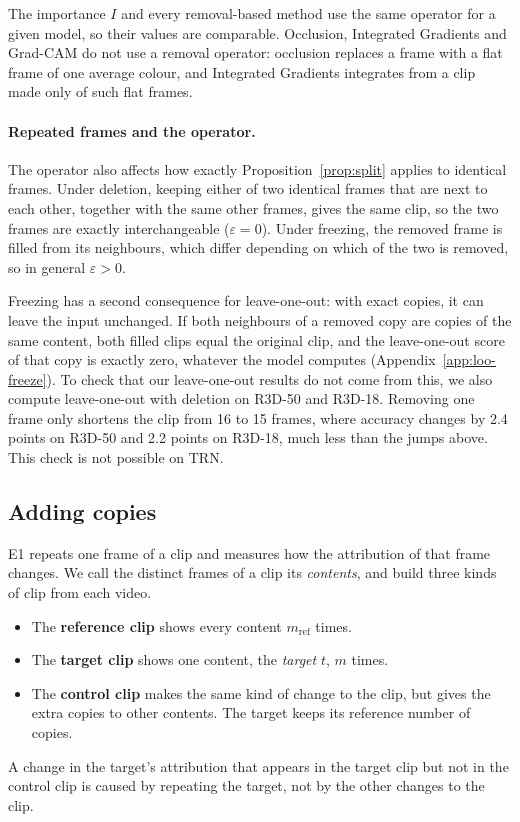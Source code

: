 The importance $I$ and every removal-based method use the same operator for a given model, so their values are comparable.
Occlusion, Integrated Gradients and Grad-CAM do not use a removal operator: occlusion replaces a frame with a flat frame of one average colour, and Integrated Gradients integrates from a clip made only of such flat frames.

\paragraph{Repeated frames and the operator.}
The operator also affects how exactly Proposition~\ref{prop:split} applies to identical frames.
Under deletion, keeping either of two identical frames that are next to each other, together with the same other frames, gives the same clip, so the two frames are exactly interchangeable ($\varepsilon = 0$).
Under freezing, the removed frame is filled from its neighbours, which differ depending on which of the two is removed, so in general $\varepsilon > 0$.

Freezing has a second consequence for leave-one-out: with exact copies, it can leave the input unchanged.
If both neighbours of a removed copy are copies of the same content, both filled clips equal the original clip, and the leave-one-out score of that copy is exactly zero, whatever the model computes (Appendix~\ref{app:loo-freeze}).
To check that our leave-one-out results do not come from this, we also compute leave-one-out with deletion on R3D-50 and R3D-18.
Removing one frame only shortens the clip from 16 to 15 frames, where accuracy changes by 2.4 points on R3D-50 and 2.2 points on R3D-18, much less than the jumps above.
This check is not possible on TRN.

\subsection{Adding copies}
\label{sec:adding}

E1 repeats one frame of a clip and measures how the attribution of that frame changes.
We call the distinct frames of a clip its \emph{contents}, and build three kinds of clip from each video.
\begin{itemize}
  \item The \textbf{reference clip} shows every content $m_{\mathrm{ref}}$ times.
  \item The \textbf{target clip} shows one content, the \emph{target} $t$, $m$ times.
  \item The \textbf{control clip} makes the same kind of change to the clip, but gives the extra copies to other contents. The target keeps its reference number of copies.
\end{itemize}
A change in the target's attribution that appears in the target clip but not in the control clip is caused by repeating the target, not by the other changes to the clip.

